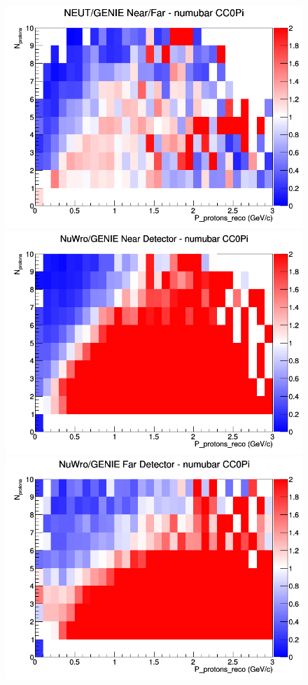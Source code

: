 \begin{figure}[h]
\endminipage
{}
\includegraphics[width=\linewidth]{eff_N_P/GAr/protons/ratios/CC0Pi_NEUT_GENIE_numubar_NF_N_P.png}
\endminipage
\newline
{}
\includegraphics[width=\linewidth]{eff_N_P/GAr/protons/ratios/CC0Pi_NuWro_GENIE_numubar_near_N_P.png}
\endminipage
{}
\includegraphics[width=\linewidth]{eff_N_P/GAr/protons/ratios/CC0Pi_NuWro_GENIE_numubar_far_N_P.png}

\end{figure}
